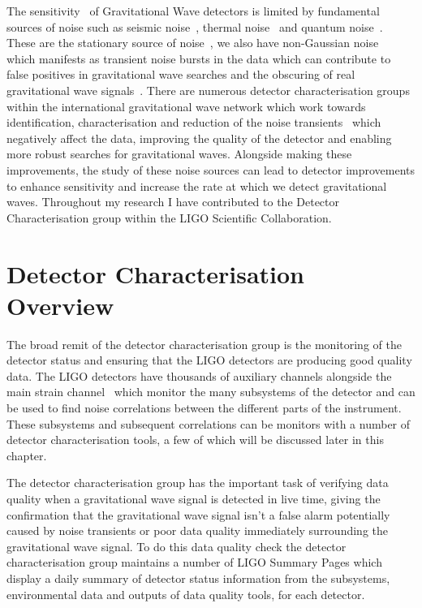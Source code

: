 The sensitivity~\cite{aLIGO_design_curve:2018} of Gravitational Wave detectors is limited by fundamental sources of noise such as seismic noise~\cite{Glanzer:2023}, thermal noise~\cite{thermal_noise:2018} and quantum noise~\cite{quantum_noise:2003}. These are the stationary source of noise~\cite{PSD_var:2020}, we also have non-Gaussian noise~\cite{Noise_Guide:2020} which manifests as transient noise bursts in the data which can contribute to false positives in gravitational wave searches and the obscuring of real gravitational wave signals~\cite{GW170817:2017, GW150914_noise:2016}. There are numerous detector characterisation groups~\cite{O2O3_DetChar:2021, VirgoDetChar:2023} within the international gravitational wave network which work towards identification, characterisation and reduction of the noise transients~\cite{ArchEnemy:2023, Glanzer:2023, gravityspy:2017, gravityspy:2021, gravityspy:2023, glitschen:2021, Nuttall:2018, reducing_scattering:2020, BayesWave:2015, gwadaptive:2022, O3_subtraction:2022, Powell:2016} which negatively affect the data, improving the quality of the detector and enabling more robust searches for gravitational waves. Alongside making these improvements, the study of these noise sources can lead to detector improvements to enhance sensitivity and increase the rate at which we detect gravitational waves. Throughout my research I have contributed to the Detector Characterisation group within the LIGO Scientific Collaboration.

\section{Detector Characterisation Overview}

The broad remit of the detector characterisation group is the monitoring of the detector status and ensuring that the LIGO detectors are producing good quality data. The LIGO detectors have thousands of auxiliary channels alongside the main strain channel~\cite{iDQ:2020} which monitor the many subsystems of the detector and can be used to find noise correlations between the different parts of the instrument. These subsystems and subsequent correlations can be monitors with a number of detector characterisation tools, a few of which will be discussed later in this chapter.

The detector characterisation group has the important task of verifying data quality when a gravitational wave signal is detected in live time, giving the confirmation that the gravitational wave signal isn't a false alarm potentially caused by noise transients or poor data quality immediately surrounding the gravitational wave signal. To do this data quality check the detector characterisation group maintains a number of LIGO Summary Pages which display a daily summary of detector status information from the subsystems, environmental data and outputs of data quality tools, for each detector.


